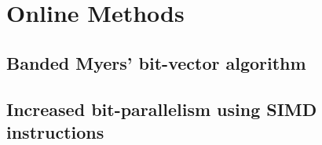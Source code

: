 
\chapter{Online Methods}
\label{chr:online}
\section{Banded Myers' bit-vector algorithm}
\section{Increased bit-parallelism using SIMD instructions}
